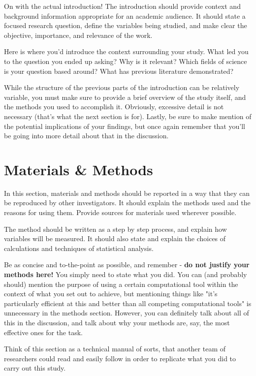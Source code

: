 \documentclass[10pt,twocolumn,letterpaper]{article}
\begin{document}
On with the actual introduction! The introduction should provide context and background information appropriate for an academic audience. It should state a focused research question, define the variables being studied, and make clear the objective, importance, and relevance of the work.

Here is where you'd introduce the context surrounding your study. What led you to the question you ended up asking? Why is it relevant? Which fields of science is your question based around? What has previous literature demonstrated?

While the structure of the previous parts of the introduction can be relatively variable, you must make sure to provide a brief overview of the study itself, and the methods you used to accomplish it. Obviously, excessive detail is not necessary (that's what the next section is for). Lastly, be sure to make mention of the potential implications of your findings, but once again remember that you'll be going into more detail about that in the discussion.

\section{Materials \& Methods}
In this section, materials and methods should be reported in a way that they can be reproduced by other investigators. It should explain the methods used and the reasons for using them. Provide sources for materials used wherever possible.

The method should be written as a step by step process, and explain how variables will be measured. It should also state and explain the choices of calculations and techniques of statistical analysis.

Be as concise and to-the-point as possible, and remember - \textbf{do not justify your methods here!} You simply need to state what you did. You can (and probably should) mention the purpose of using a certain computational tool within the context of what you set out to achieve, but mentioning things like "it's particularly efficient at this and better than all competing computational tools" is unnecessary in the methods section. However, you can definitely talk about all of this in the discussion, and talk about why your methods are, say, the most effective ones for the task.

Think of this section as a technical manual of sorts, that another team of researchers could read and easily follow in order to replicate what you did to carry out this study.
\end{document}
